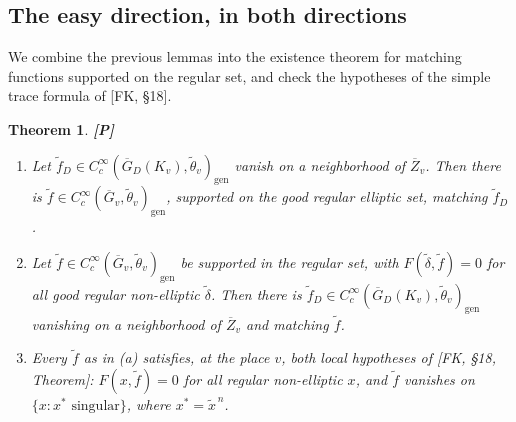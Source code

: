 \documentclass[12pt]{article}
\newcommand{\ov}[1]{\overline{#1}}
\newcommand{\gen}{\mathrm{gen}}
\newcommand{\Gb}{\ov{G}}
\newcommand{\Zb}{\ov{Z}}
\newcommand{\GDb}{\ov{G}_D}
\newcommand{\Pv}{\textbf{[P]}}
\theoremstyle{plain}
\newtheorem{theorem}{Theorem}[section]
\theoremstyle{definition}
\begin{document}
\subsection{The easy direction, in both directions}\label{subsec:easy}
We combine the previous lemmas into the existence theorem for matching functions supported on the regular set, and check the hypotheses of the simple trace formula of [FK, \S18].

\begin{theorem}\label{thm:easy}\Pv
\begin{enumerate}[label=(\alph*)]
\item Let $\tilde f_D\in C_c^\infty(\GDb(K_v),\tilde\theta_v)_\gen$ vanish on a neighborhood of $\Zb_v$. Then there is $\tilde f\in C_c^\infty(\Gb_v,\tilde\theta_v)_\gen$, supported on the good regular elliptic set, matching $\tilde f_D$.
\item Let $\tilde f\in C_c^\infty(\Gb_v,\tilde\theta_v)_\gen$ be supported in the regular set, with $F(\tilde\delta,\tilde f)=0$ for all good regular non-elliptic $\tilde\delta$. Then there is $\tilde f_D\in C_c^\infty(\GDb(K_v),\tilde\theta_v)_\gen$ vanishing on a neighborhood of $\Zb_v$ and matching $\tilde f$.
\item Every $\tilde f$ as in (a) satisfies, at the place $v$, both local hypotheses of [FK, \S18, Theorem]: $F(x,\tilde f)=0$ for all regular non-elliptic $x$, and $\tilde f$ vanishes on $\{x:x^*\text{ singular}\}$, where $x^*=\tilde x^{\,n}$.
\end{enumerate}
\end{theorem}
\end{document}
